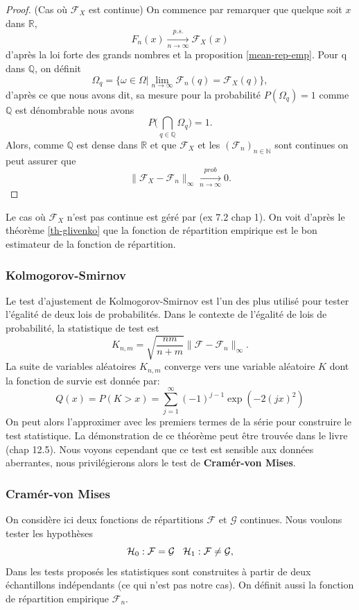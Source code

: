 \documentclass[a4paper,10pt]{article}
\begin{document}
\begin{proof} (Cas où $\mathcal{F}_X$ est continue)
	On commence par remarquer que quelque soit $x$ dans $\mathbb{R}$, \[F_{n}(x)\xrightarrow[n\to \infty]{p.s.}\mathcal{F}_X(x)\] d'après la loi forte des grands nombres et la proposition \eqref{mean-rep-emp}. Pour q dans $\mathbb{Q}$, on définit 
	\[\Omega_{q}=\{\omega \in \Omega | \lim_{n \to \infty} \mathcal{F}_{n}(q)=\mathcal{F}_X(q)\},\]
	d'après ce que nous avons dit, sa mesure pour la probabilité $P(\Omega_q)=1$ comme $\mathbb{Q}$ est dénombrable nous avons  
	\[P\Big(\bigcap_{q \in \mathbb{Q}} \Omega_q \Big)=1.\]
	Alors, comme $\mathbb{Q}$ est dense dans $\mathbb{R}$ et que $\mathcal{F}_{X}$ et les $(\mathcal{F}_n)_{n \in \mathbb{N}}$ sont continues on peut assurer que   
	\[	\|\mathcal{F}_{X}-\mathcal{F}_{n}\|_{\infty} \xrightarrow[n\to \infty]{prob} 0. \]
\end{proof}
Le cas où $\mathcal{F}_{X}$ n'est pas continue est géré par \cite{durrett2019probability} (ex 7.2 chap 1). On voit d'après le théorème \ref{th-glivenko} que la fonction de répartition empirique est le bon estimateur de la fonction de répartition. 
\subsubsection{Kolmogorov-Smirnov}

Le test d'ajustement  de  Kolmogorov-Smirnov est  l'un des plus  utilisé pour tester l'égalité de deux lois  de probabilités. Dans  le  contexte de  l'égalité de lois  de probabilité, la statistique  de  test  est 
\[K_{n,m}= \sqrt{\frac{nm}{n+m}}\|\mathcal{F}-\mathcal{F}_n\|_{\infty}.\]
La suite de variables aléatoires $K_{n,m}$ converge vers une variable aléatoire $K$ dont la fonction de survie est donnée par: 
\begin{equation}
	Q(x)=P(K>x)=\sum_{j=1}^{\infty}(-1)^{j-1}\exp(-2(jx)^2)
\end{equation}
On peut alors l'approximer avec les premiers termes de la série pour construire le test statistique. La démonstration de ce théorème peut être trouvée dans le livre \cite{walker1965probability}(chap 12.5). Nous voyons cependant que ce test est sensible aux données aberrantes, nous privilégierons alors le test de \textbf{Cramér-von Mises}.


\subsubsection{Cramér-von Mises}
On considère ici deux fonctions de répartitions $\mathcal{F}$ et $\mathcal{G}$ continues. Nous voulons tester les hypothèses
\begin{equation*}
	\mathcal{H}_0 : \mathcal{F} = \mathcal{G} \hspace{3mm} \mathcal{H}_1 : \mathcal{F} \neq \mathcal{G},
\end{equation*}
Dans les tests proposés les statistiques sont construites à partir de deux échantillons indépendants (ce qui n'est pas notre cas). On définit aussi la fonction de répartition empirique $\mathcal{F}_n$.
\end{document}
